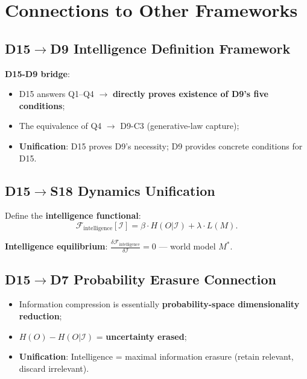 \documentclass[12pt, a4paper]{article}
\newcommand{\calI}{\mathcal{I}}
\newcommand{\calF}{\mathcal{F}}
\begin{document}
\section{Connections to Other Frameworks}\label{sec:connections}

\subsection{D15$\rightarrow$D9 Intelligence Definition Framework}

\textbf{D15-D9 bridge}:
\begin{itemize}
\item D15 answers Q1--Q4 $\rightarrow$ \textbf{directly proves existence of D9's five conditions};
\item The equivalence of Q4 $\rightarrow$ D9-C3 (generative-law capture);
\item \textbf{Unification}: D15 proves D9's necessity; D9 provides concrete conditions for D15.
\end{itemize}

\subsection{D15$\rightarrow$S18 Dynamics Unification}

Define the \textbf{intelligence functional}:
\begin{equation}
\calF_{\text{intelligence}}[\calI] = \beta\cdot H(O|\calI) + \lambda\cdot L(M).
\end{equation}

\textbf{Intelligence equilibrium}: $\displaystyle\frac{\delta\calF_{\text{intelligence}}}{\delta\calI} = 0$ --- world model $M^{*}$.

\subsection{D15$\rightarrow$D7 Probability Erasure Connection}

\begin{itemize}
\item Information compression is essentially \textbf{probability-space dimensionality reduction};
\item $H(O) - H(O|\calI)$ = \textbf{uncertainty erased};
\item \textbf{Unification}: Intelligence = maximal information erasure (retain relevant, discard irrelevant).
\end{itemize}
\end{document}
